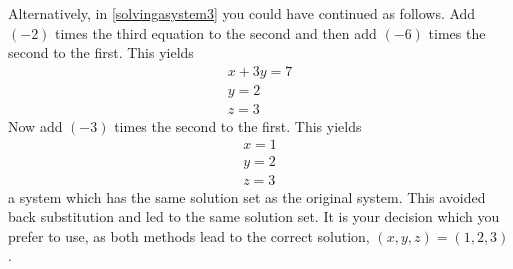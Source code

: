 \begin{solution}
Alternatively, in \ref{solvingasystem3} you could have continued as follows. Add $\left(
-2\right) $ times the third equation to the second and then add $\left(
-6\right) $ times the second to the first. This yields
\begin{equation*}
\allowbreak
\begin{array}{c}
x+3y=7 \\
y=2 \\
z=3
\end{array}
\end{equation*}
Now add $\left( -3\right) $ times the second to the first. This yields
\begin{equation*}
\allowbreak
\begin{array}{c}
x=1 \\
y=2 \\
z=3
\end{array}
\end{equation*}
a system which has the same solution set as the original system. This
avoided back substitution and led to the same solution set. It is your decision which you prefer to use, as both methods lead to the correct solution,
$\left( x,y,z \right) = \left(1,2,3\right)$.
\end{solution}